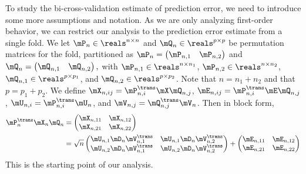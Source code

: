 To study the bi-cross-validation estimate of prediction error, we need to 
introduce some more assumptions and notation.  As we are only analyzing first-order 
behavior, we can restrict our analysis to the prediction error estimate from a 
single fold.  We let $\mP_n \in \reals^{n \times n}$ and 
$\mQ_n \in \reals^{p \times p}$ be permutation matrices for the fold, partitioned as
\(
    \mP_n 
        = 
        \left( 
        \begin{matrix}
            \mP_{n,1} & \mP_{n,2}
        \end{matrix}
        \right)
\)
and
\(
    \mQ_n
        =
        \left(
        \begin{matrix}
            \mQ_{n,1} & \mQ_{n,2}
        \end{matrix}
        \right),
\)
with $\mP_{n,1} \in \reals^{n \times n_1}$, $\mP_{n,2} \in \reals^{n \times n_2}$, $\mQ_{n,1} \in \reals^{p \times p_1}$, and $\mQ_{n,2} \in \reals^{p \times p_2}$.  Note that $n = n_1 + n_2$ and that $p = p_1 + p_2$.  We define
$\mX_{n,ij} = \mP_{n,i}^\trans \mX \mQ_{n,j}$,
$\mE_{n,ij} = \mP_{n,i}^\trans \mE \mQ_{n,j}$,
$\mU_{n,i} = \mP_{n,i}^\trans \mU_n$, and
$\mV_{n,j} = \mQ_{n,j}^\trans \mV_n$.  Then in block form,
\begin{align}
    \mP_n^\trans \mX_n \mQ_n
        &=
            \left(
            \begin{matrix}
                \mX_{n,11} & \mX_{n,12} \\
                \mX_{n,21} & \mX_{n,22}
            \end{matrix}
            \right) \notag \\
        &=
            \sqrt{n}
            \left(
            \begin{matrix}
                \mU_{n,1} \mD_n \mV_{n,1}^\trans &
                    \mU_{n,1} \mD_n \mV_{n,2}^\trans \\
                \mU_{n,2} \mD_n \mV_{n,1}^\trans &
                    \mU_{n,2} \mD_n \mV_{n,2}^\trans
            \end{matrix}
            \right)
            +
            \left(
            \begin{matrix}
                \mE_{n,11} & \mE_{n,12} \\
                \mE_{n,21} & \mE_{n,22}
            \end{matrix}
            \right)
\end{align}
This is the starting point of our analysis.

